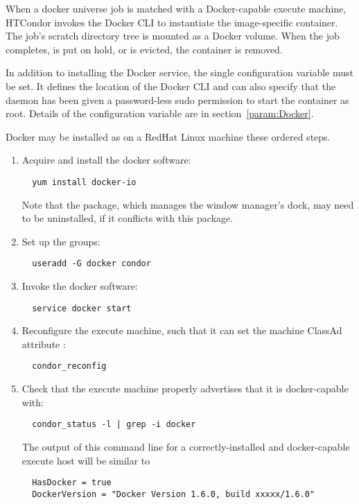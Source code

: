 When a docker universe job is matched with a Docker-capable
execute machine,
HTCondor invokes the Docker CLI to instantiate the image-specific container.
The job's scratch directory tree is mounted as a Docker volume.
When the job completes, is put on hold, or is evicted, the container is removed.

In addition to installing the Docker service, 
the single configuration variable  must be set.
It defines the location of the Docker CLI and can also specify that
the  daemon has been given a password-less sudo
permission to start the container as root.
Details of the  configuration variable are in
section~\ref{param:Docker}.

Docker may be installed as  on a RedHat Linux machine these
ordered steps.
\begin{enumerate}
\item
Acquire and install the docker software:
\begin{verbatim}
  yum install docker-io
\end{verbatim}
Note that the  package,
which manages the window manager's dock,
 may need to be uninstalled,
if it conflicts with this  package.
\item
Set up the groups:
\begin{verbatim}
  useradd -G docker condor
\end{verbatim}
\item
Invoke the docker software:
\begin{verbatim}
  service docker start
\end{verbatim}
\item
Reconfigure the execute machine, such that it can set the machine ClassAd
attribute :
\begin{verbatim}
  condor_reconfig
\end{verbatim}
\item
Check that the execute machine properly advertises that it is docker-capable
with:
\begin{verbatim}
  condor_status -l | grep -i docker
\end{verbatim}
The output of this command line for a correctly-installed and 
docker-capable execute host will be similar to
\begin{verbatim}
  HasDocker = true
  DockerVersion = "Docker Version 1.6.0, build xxxxx/1.6.0"
\end{verbatim}
\end{enumerate}

